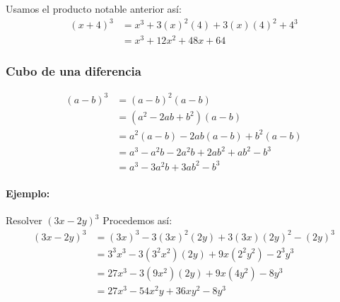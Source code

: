 \documentclass[10pt,twoside]{article}
\begin{document}
Usamos el producto notable anterior así:
\begin{align*}
(x+4)^3&=x^3+3(x)^2(4)+3(x)(4)^2+4^3\\
&=x^{3}+12x^2+48x+64
\end{align*}
\subsubsection*{Cubo de una diferencia}
\begin{align*}
(a-b)^3&=(a-b)^2(a-b)\\
&=(a^2-2ab+b^2)(a-b)\\
&=a^2(a-b)-2ab(a-b)+b^2(a-b)\\
&=a^3-a^2b-2a^2b+2ab^2+ab^2-b^3\\
&=a^3-3a^2b+3ab^2-b^3
\end{align*}
\paragraph*{Ejemplo:}

Resolver $(3x-2y)^3$
Procedemos así:
\begin{align*}
(3x-2y)^3&=(3x)^3-3(3x)^2(2y)+3(3x)(2y)^2-(2y)^3\\
&=3^3x^3-3(3^2x^2)(2y)+9x(2^2y^2)-2^3y^3\\
&=27x^3-3(9x^2)(2y)+9x(4y^2)-8y^3\\
&=27x^3-54x^2y+36xy^2-8y^3
\end{align*}
\end{document}
